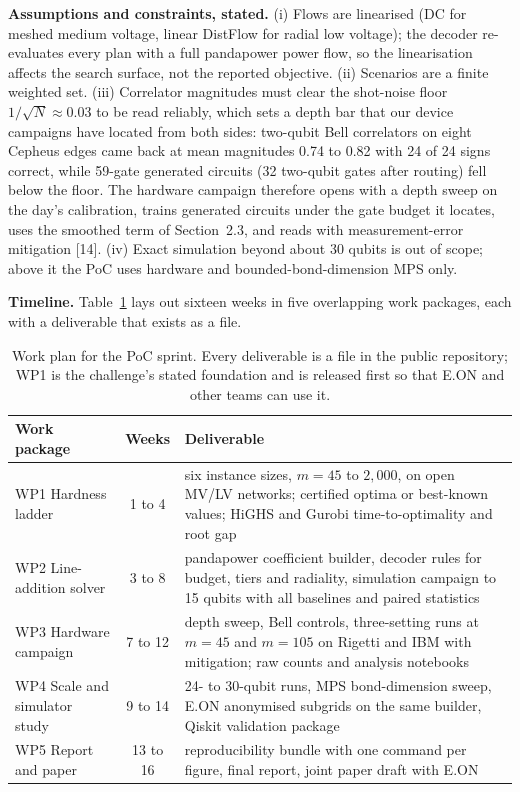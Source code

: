 \documentclass[10pt,a4paper]{article}
\begin{document}
\textbf{Assumptions and constraints, stated.} (i) Flows are linearised (DC for
meshed medium voltage, linear DistFlow for radial low voltage); the decoder
re-evaluates every plan with a full pandapower power flow, so the linearisation
affects the search surface, not the reported objective. (ii) Scenarios are a
finite weighted set. (iii) Correlator magnitudes must clear the shot-noise
floor $1/\sqrt{N}\approx0.03$ to be read reliably, which sets a depth bar
that our device campaigns have located from both sides: two-qubit Bell
correlators on eight Cepheus edges came back at mean magnitudes 0.74 to 0.82
with 24 of 24 signs correct, while 59-gate generated circuits (32 two-qubit
gates after routing) fell below the floor. The hardware campaign therefore
opens with a depth sweep on the day's calibration, trains generated circuits
under the gate budget it locates, uses the smoothed term of Section~2.3, and
reads with measurement-error mitigation [14]. (iv) Exact simulation beyond
about 30 qubits is out of scope; above it the PoC uses hardware and
bounded-bond-dimension MPS only.

\textbf{Timeline.} Table~\ref{tab:plan} lays out sixteen weeks in five
overlapping work packages, each with a deliverable that exists as a file.

\begin{table}[t]
\centering
\caption{Work plan for the PoC sprint. Every deliverable is a file in the
public repository; WP1 is the challenge's stated foundation and is released
first so that E.ON and other teams can use it.}
\label{tab:plan}
\begin{tabularx}{\textwidth}{@{}lcX@{}}
\toprule
Work package & Weeks & Deliverable \\
\midrule
WP1 Hardness ladder & 1 to 4 & six instance sizes, $m=45$ to $2{,}000$, on open MV/LV networks; certified optima or best-known values; HiGHS and Gurobi time-to-optimality and root gap \\
WP2 Line-addition solver & 3 to 8 & pandapower coefficient builder, decoder rules for budget, tiers and radiality, simulation campaign to 15 qubits with all baselines and paired statistics \\
WP3 Hardware campaign & 7 to 12 & depth sweep, Bell controls, three-setting runs at $m=45$ and $m=105$ on Rigetti and IBM with mitigation; raw counts and analysis notebooks \\
WP4 Scale and simulator study & 9 to 14 & 24- to 30-qubit runs, MPS bond-dimension sweep, E.ON anonymised subgrids on the same builder, Qiskit validation package \\
WP5 Report and paper & 13 to 16 & reproducibility bundle with one command per figure, final report, joint paper draft with E.ON \\
\bottomrule
\end{tabularx}
\end{table}
\end{document}

